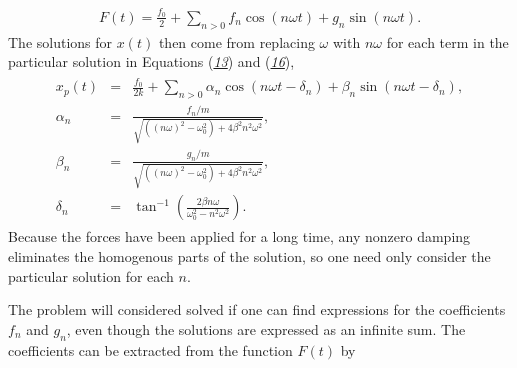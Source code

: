 \documentclass[letterpaper,10pt,english]{sphinxmanual}
\begin{document}
\begin{equation*}
\begin{split}
\begin{equation}
\label{eq:fourierdef1} \tag{36}
F(t)=\frac{f_0}{2}+\sum_{n>0}f_n\cos(n\omega t)+g_n\sin(n\omega t).
\end{equation}
\end{split}
\end{equation*}
The solutions for \(x(t)\) then come from replacing \(\omega\) with
\(n\omega\) for each term in the particular solution in Equations
({\hyperref[\detokenize{chapter4:eq:partform}]{\emph{13}}}) and ({\hyperref[\detokenize{chapter4:eq:Ddrive}]{\emph{16}}}),
\begin{equation*}
\begin{split}
\begin{eqnarray}
x_p(t)&=&\frac{f_0}{2k}+\sum_{n>0} \alpha_n\cos(n\omega t-\delta_n)+\beta_n\sin(n\omega t-\delta_n),\\
\nonumber
\alpha_n&=&\frac{f_n/m}{\sqrt{((n\omega)^2-\omega_0^2)+4\beta^2n^2\omega^2}},\\
\nonumber
\beta_n&=&\frac{g_n/m}{\sqrt{((n\omega)^2-\omega_0^2)+4\beta^2n^2\omega^2}},\\
\nonumber
\delta_n&=&\tan^{-1}\left(\frac{2\beta n\omega}{\omega_0^2-n^2\omega^2}\right).
\end{eqnarray}
\end{split}
\end{equation*}
Because the forces have been applied for a long time, any non\sphinxhyphen{}zero
damping eliminates the homogenous parts of the solution, so one need
only consider the particular solution for each \(n\).

The problem will considered solved if one can find expressions for the
coefficients \(f_n\) and \(g_n\), even though the solutions are expressed
as an infinite sum. The coefficients can be extracted from the
function \(F(t)\) by
\end{document}
